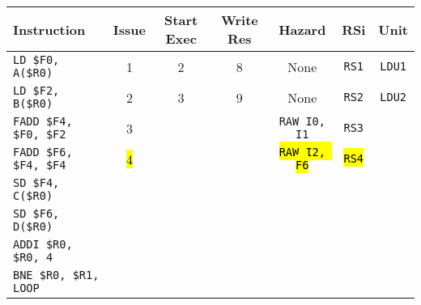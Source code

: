 \begin{enumerate}
    \begin{table}[!htp]
        \centering
        \begin{adjustbox}{width={\textwidth},totalheight={\textheight},keepaspectratio}
        \begin{tabular}{@{} l c c c c c c @{}}
            \toprule
            \textbf{Instruction} & \textbf{Issue} & \textbf{Start Exec} & \textbf{Write Res} & \textbf{Hazard} & \textbf{RSi} & \textbf{Unit} \\
            \midrule
            \texttt{LD \$F0, A(\$R0)}       & 1 & 2 & 8 & None  & \texttt{RS1}   & \texttt{LDU1}  \\ [.5em]
            \texttt{LD \$F2, B(\$R0)}       & 2 & 3 & 9 & None  & \texttt{RS2}   & \texttt{LDU2}  \\ [.5em]
            \texttt{FADD \$F4, \$F0, \$F2}  & 3 &   &   & \texttt{RAW I0, I1} & \texttt{RS3} &       \\ [.5em]
            \texttt{FADD \$F6, \$F4, \$F4}  & \hl{4} &   &   & \hl{\texttt{RAW I2, F6}} & \hl{\texttt{RS4}} &       \\ [.5em]
            \texttt{SD \$F4, C(\$R0)}       &   &   &   &       &       &       \\ [.5em]
            \texttt{SD \$F6, D(\$R0)}       &   &   &   &       &       &       \\ [.5em]
            \texttt{ADDI \$R0, \$R0, 4}     &   &   &   &       &       &       \\ [.5em]
            \texttt{BNE \$R0, \$R1, LOOP}   &   &   &   &       &       &       \\
            \bottomrule
        \end{tabular}
        \end{adjustbox}
    \end{table}
    

\end{enumerate}
